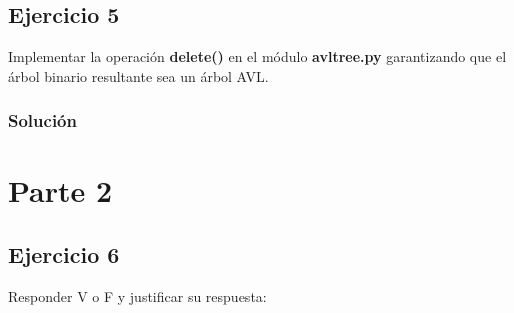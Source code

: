 \documentclass{article}
\begin{document}
\pagebreak
\subsection*{Ejercicio 5}
Implementar la operación \textbf{delete()} en  el módulo \textbf{avltree.py} garantizando que el árbol  binario resultante sea un árbol AVL.
\subsubsection*{Solución}


\pagebreak
\section*{Parte 2}
\subsection*{Ejercicio 6}
Responder V o F y justificar su respuesta:
\end{document}
